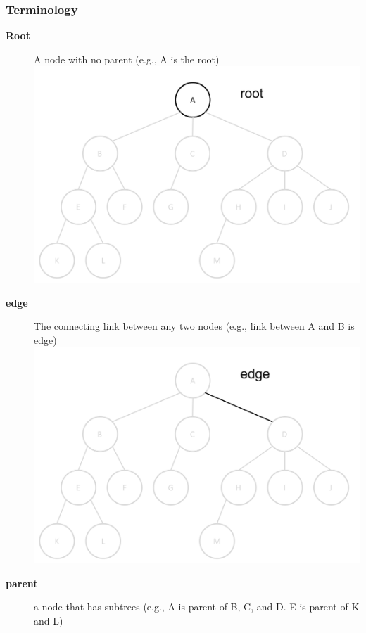 \documentclass[newPxFont,sthlmFooter,nooffset]{beamer}
\begin{document}
\begin{frame}[t, allowframebreaks]
  \frametitle{Terminology}
  \begin{description}
  \item[\textbf{Root}] A node with no parent (e.g., A is the root)\\
\includegraphics[height=0.3\textheight]{./figures/fig02_def_root.png}
  \item[\textbf{edge}] The connecting link between any two nodes (e.g., link between A and B is edge)\\
\includegraphics[height=0.3\textheight]{./figures/fig02_def_edge.png}
  \item[\textbf{parent}] a node that has subtrees (e.g., A is parent of B, C, and D. E is parent of K and L)\\

\end{description}
\end{frame}
\end{document}
